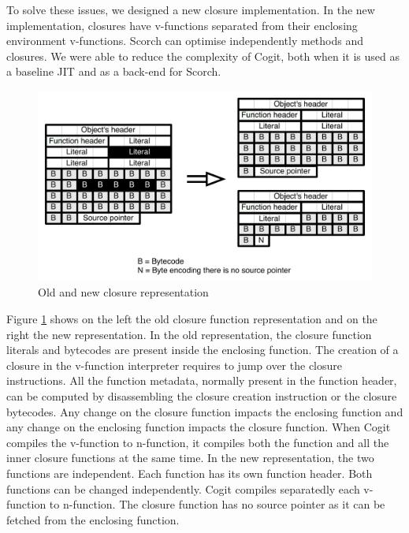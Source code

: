\documentclass[a4paper,12pt,twoside]{../includes/ThesisStyle}
\begin{document}
To solve these issues, we designed a new closure implementation. In the new implementation, closures have v-functions separated from their enclosing environment v-functions. Scorch can optimise independently methods and closures. We were able to reduce the complexity of Cogit, both when it is used as a baseline JIT and as a back-end for Scorch.

\begin{figure}[h!]
    \begin{center}
        \includegraphics[width=0.85\linewidth]{CompiledBlock}
        \caption{Old and new closure representation}
        \label{fig:CompiledBlock}
    \end{center}
\end{figure}

Figure \ref{fig:CompiledBlock} shows on the left the old closure function representation and on the right the new representation. In the old representation, the closure function literals and bytecodes are present inside the enclosing function. The creation of a closure in the v-function interpreter requires to jump over the closure instructions. All the function metadata, normally present in the function header, can be computed by disassembling the closure creation instruction or the closure bytecodes. Any change on the closure function impacts the enclosing function and any change on the enclosing function impacts the closure function. When Cogit compiles the v-function to n-function, it compiles both the function and all the inner closure functions at the same time. In the new representation, the two functions are independent. Each function has its own function header. Both functions can be changed independently. Cogit compiles separatedly each v-function to n-function. The closure function has no source pointer as it can be fetched from the enclosing function.


\ifx\wholebook\relax\else
    
\end{document}
